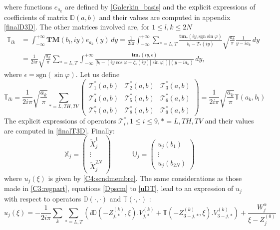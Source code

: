 where functions $e_{a_k}$ are defined by \eqref{Galerkin_basis} and the explicit expressions of coefficients of matrix $\mathbb{D}(a,b)$ and their values are computed in appendix \ref{finalD3D}. The other matrices involved are, for $1\leq l,k \leq 2N$
\begin{equation}
\begin{split}
\mathbb{T}_{lk}&=\int_{-\infty}^{+\infty} \textbf{TM}(b_l,iy)e_{a_k}(y) \, dy 
=\frac{1}{2i\pi} \int_{-\infty}^{+\infty} \sum_{*=L,T} \frac{\textbf{tm}_* (iy, \mbox{sgn} \sin \varphi)}{b_l-T_*(iy)} \sqrt{\frac{a_k}{\pi}}\frac{1}{y-ia_k}\,dy \\
&=\frac{1}{2i\pi}\sqrt{\frac{a_k}{\pi}}\sum_{*=L,T} \int_{-\infty}^{+\infty} \frac{\textbf{tm}_*(iy,\epsilon)}{\lbrack b_l-(iy \cos \varphi +  \zeta_*(iy)| \sin \varphi|)\rbrack(y-ia_k)} \, dy,
\end{split}
\end{equation}
where $\epsilon= \mbox{sgn}( \sin \varphi)$. Let us define
\begin{equation}
\mathbb{T}_{lk}=\frac{1}{2i\pi}\sqrt{\frac{a_k}{\pi}}
\sum_{*=L,TH,TV}
\begin{pmatrix}
\mathcal{T}_1^*(a,b) &  \mathcal{T}_2^*(a,b) &\mathcal{T}_3^*(a,b) \\
\mathcal{T}_4^*(a,b) &\mathcal{T}_5^*(a,b)&\mathcal{T}_6^*(a,b)\\
\mathcal{T}_7^*(a,b)&\mathcal{T}_8^*(a,b)&\mathcal{T}_9^*(a,b)
\end{pmatrix}
=\frac{1}{2i\pi}\sqrt{\frac{a_k}{\pi}}\mathbb{T}(a_k,b_l)
\label{Tab}
\end{equation}
The explicit expressions of operators $\mathcal{T}_i^*, 1\leq i\leq9, *=L,TH,TV$ and their values are computed in \ref{finalT3D}. Finally:
\begin{equation}
\mathbb{X}_j=
\begin{pmatrix}
\tilde{X}_j^1\\
\vdots \\
\tilde{X}_j^{2N}
\end{pmatrix}
\hspace{3em}
\mathbb{U}_j=
\begin{pmatrix}
u_j(b_1)\\
\vdots \\
u_j(b_{2N})
\end{pmatrix}
\label{C4:vecXUj}
\end{equation}
where $u_j(\xi)$ is given by \eqref{C4:scndmembre}. The same considerations as those made in \ref{C3:regpart}, equations \eqref{Dpscm} to \eqref{uDT}, lead to an expression of $u_j$ with respect to operators $\mathbb{D}(\cdot,\cdot)$ and $\mathbb{T}(\cdot,\cdot)$ :
\begin{equation}
u_j(\xi)=-\frac{1}{2i\pi}\sum_{k}\sum_{*=L,T}\left(i\mathbb{D}(-Z_{j,*}^{(k)},\xi).V_{j,*}^{(k)}+\mathbb{T}(-Z_{3-j,*}^{(k)},\xi).V_{3-j,*}^{(k)} \right) +\frac{W_j^{\alpha}}{\xi-Z_j^{(0)}}
\label{C4:uDT}
\end{equation}

